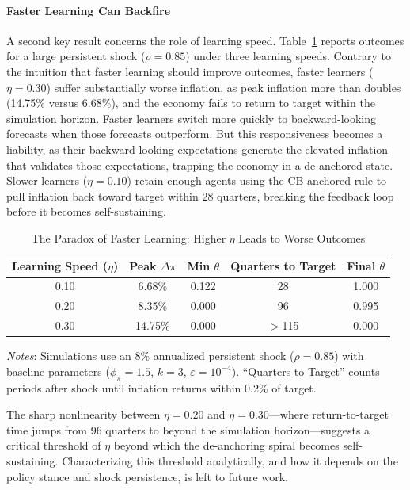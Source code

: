 \documentclass[10pt]{article}
\begin{document}
\paragraph{Faster Learning Can Backfire}

A second key result concerns the role of learning speed. Table~\ref{tab:paradox_learning} reports outcomes for a large persistent shock ($\rho = 0.85$) under three learning speeds. Contrary to the intuition that faster learning should improve outcomes, faster learners ($\eta = 0.30$) suffer substantially worse inflation, as peak inflation more than doubles (14.75\% versus 6.68\%), and the economy fails to return to target within the simulation horizon. Faster learners switch more quickly to backward-looking forecasts when those forecasts outperform. But this responsiveness becomes a liability, as their backward-looking expectations generate the elevated inflation that validates those expectations, trapping the economy in a de-anchored state. Slower learners ($\eta = 0.10$) retain enough agents using the CB-anchored rule to pull inflation back toward target within 28 quarters, breaking the feedback loop before it becomes self-sustaining.

\begin{table}[htbp]
\centering
\caption{The Paradox of Faster Learning: Higher $\eta$ Leads to Worse Outcomes}
\label{tab:paradox_learning}
\begin{tabular}{ccccc}
\toprule
Learning Speed ($\eta$) & Peak $\Delta\pi$ & Min $\theta$ & Quarters to Target & Final $\theta$ \\
\midrule
0.10 & 6.68\% & 0.122 & 28 & 1.000 \\
0.20 & 8.35\% & 0.000 & 96 & 0.995 \\
0.30 & 14.75\% & 0.000 & $>$115 & 0.000 \\
\bottomrule
\end{tabular}
\begin{tablenotes}
\small
\item \textit{Notes}: Simulations use an 8\% annualized persistent shock ($\rho = 0.85$) with baseline parameters ($\phi_\pi = 1.5$, $k = 3$, $\varepsilon = 10^{-4}$). ``Quarters to Target'' counts periods after shock until inflation returns within 0.2\% of target.
\end{tablenotes}
\end{table}

The sharp nonlinearity between $\eta = 0.20$ and $\eta = 0.30$---where return-to-target time jumps from 96 quarters to beyond the simulation horizon---suggests a critical threshold of $\eta$ beyond which the de-anchoring spiral becomes self-sustaining. Characterizing this threshold analytically, and how it depends on the policy stance and shock persistence, is left to future work.
\end{document}
